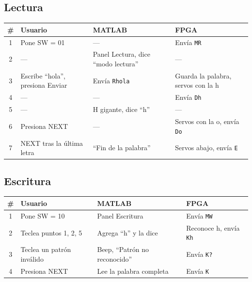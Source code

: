 \documentclass[11pt,a4paper]{article}
\newcommand{\cod}[1]{\texttt{#1}}
\begin{document}
\subsection{Lectura}
\begin{longtable}{c p{4.2cm} p{4.6cm} p{4.4cm}}
\toprule
\textbf{\#} & \textbf{Usuario} & \textbf{MATLAB} & \textbf{FPGA} \\
\midrule
\endhead
1 & Pone SW = 01 & --- & Envía \cod{MR} \\
2 & --- & Panel Lectura, dice ``modo lectura'' & --- \\
3 & Escribe ``hola'', presiona Enviar & Envía \cod{Rhola} & Guarda la palabra, servos con la h \\
4 & --- & --- & Envía \cod{Dh} \\
5 & --- & H gigante, dice ``h'' & --- \\
6 & Presiona NEXT & --- & Servos con la o, envía \cod{Do} \\
7 & NEXT tras la última letra & ``Fin de la palabra'' & Servos abajo, envía \cod{E} \\
\bottomrule
\end{longtable}

\subsection{Escritura}
\begin{longtable}{c p{4.2cm} p{4.6cm} p{4.4cm}}
\toprule
\textbf{\#} & \textbf{Usuario} & \textbf{MATLAB} & \textbf{FPGA} \\
\midrule
\endhead
1 & Pone SW = 10 & Panel Escritura & Envía \cod{MW} \\
2 & Teclea puntos 1, 2, 5 & Agrega ``h'' y la dice & Reconoce h, envía \cod{Kh} \\
3 & Teclea un patrón inválido & Beep, ``Patrón no reconocido'' & Envía \cod{K?} \\
4 & Presiona NEXT & Lee la palabra completa & Envía \cod{K\textvisiblespace} \\
\bottomrule
\end{longtable}
\end{document}
